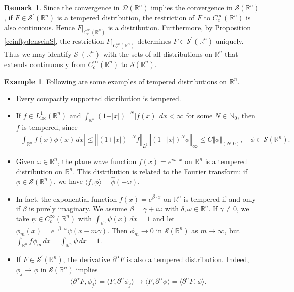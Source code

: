 \documentclass{article}
\numberwithin{equation}{section}
\newcommand{\bbN}{\mathbb{N}}
\newcommand{\bbR}{\mathbb{R}}
\renewcommand{\cal}{\mathcal}
\newcommand{\loc}{\mathrm{loc}}
\newcommand{\wh}{\widehat}
\theoremstyle{plain}
\theoremstyle{definition}
\newtheorem{example}[theorem]{Example}
\newtheorem*{remark}{Remark}
\begin{document}
\begin{remark}
Since the convergence in $\cal{D}(\bbR^n)$ implies the convergence in $\cal{S}(\bbR^n)$, if $F\in\cal{S}^\prime(\bbR^n)$ is a tempered distribution, the restriction of $F$ to $C_c^\infty(\bbR^n)$ is also continuous. Hence $F|_{C_c^\infty(\bbR^n)}$ is a distribution. Furthermore, by Proposition \ref{ccinftydenseinS}, the restriction $F|_{C_c^\infty(\bbR^n)}$ determines $F\in\cal{S}^\prime(\bbR^n)$ uniquely. Thus we may identify $\cal{S}^\prime(\bbR^n)$ with the sets of all distributions on $\bbR^n$ that extends continuously from $C_c^\infty(\bbR^n)$ to $\cal{S}(\bbR^n)$.
\end{remark}
\begin{example}
Following are some examples of tempered distributions on $\bbR^n$.
\begin{itemize}
	\item Every compactly supported distribution is tempered.
	\item If $f\in L_\loc^1(\bbR^n)$ and $\int_{\bbR^n}(1+\vert x\vert)^{-N}\vert f(x)\vert\,dx<\infty$ for some $N\in\bbN_0$, then $f$ is tempered, since
	\begin{align*}
		\left\vert\int_{\bbR^n}f(x)\phi(x)\,dx\right\vert\leq\left\Vert(1+\vert x\vert)^{-N}f\right\Vert_{L^1}\left\Vert(1+\vert x\vert)^N\phi\right\Vert_\infty\leq C\Vert\phi\Vert_{(N,0)},\quad\phi\in\cal{S}(\bbR^n).
	\end{align*}
\item Given $\omega\in\bbR^n$, the plane wave function $f(x)=e^{i\omega\cdot x}$ on $\bbR^n$ is a tempered distribution on $\bbR^n$. This distribution is related to the Fourier transform: if $\phi\in\cal{S}(\bbR^n)$, we have $\langle f,\phi\rangle=\wh{\phi}(-\omega)$. 
\item In fact, the exponential function $f(x)=e^{\beta\cdot x}$ on $\bbR^n$ is tempered if and only if $\beta$ is purely imaginary. We assume $\beta=\gamma+i\omega$ with $\delta,\omega\in\bbR^n$. If $\gamma\neq 0$, we take $\psi\in C_c^\infty(\bbR^n)$ with $\int_{\bbR^n}\psi(x)\,dx=1$ and let $\phi_m(x)=e^{-\beta\cdot x}\psi(x-m\gamma)$. Then $\phi_m\to 0$ in $\cal{S}(\bbR^n)$ as $m\to\infty$, but $\int_{\bbR^n}f\phi_m\,dx=\int_{\bbR^n}\psi\,dx=1$.
\item If $F\in\cal{S}^\prime(\bbR^n)$, the derivative $\partial^\alpha F$ is also a tempered distribution. Indeed, $\phi_j\to\phi$ in $\cal{S}(\bbR^n)$ implies
\begin{align*}
	\langle\partial^\alpha F,\phi_j\rangle=\langle F,\partial^\alpha\phi_j\rangle\to\langle F,\partial^\alpha\phi\rangle=\langle \partial^\alpha F,\phi\rangle.

\end{align*}
\end{itemize}
\end{example}
\end{document}
